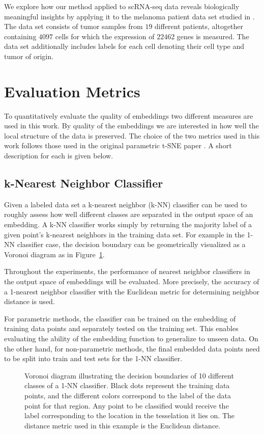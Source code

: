 We explore how our method applied to scRNA-seq data reveals biologically meaningful insights by applying it to the melanoma patient data set studied in \cite{tirosh}. The data set consists of tumor samples from $19$ different patients, altogether containing $4097$ cells for which the expression of $22462$ genes is measured. The data set additionally includes labels for each cell denoting their cell type and tumor of origin.

\section{Evaluation Metrics}

To quantitatively evaluate the quality of embeddings two different measures are used in this work. By quality of the embeddings we are interested in how well the local structure of the data is preserved. The choice of the two metrics used in this work follows those used in the original parametric t-SNE paper \cite{parametric_tsne}. A short description for each is given below.

\subsection{k-Nearest Neighbor Classifier}

Given a labeled data set a k-nearest neighbor (k-NN) classifier can be used to roughly assess how well different classes are separated in the output space of an embedding. A k-NN classifier works simply by returning the majority label of a given point's k-nearest neighbors in the training data set. For example in the 1-NN classifier case, the decision boundary can be geometrically visualized as a Voronoi diagram as in Figure~\ref{fig:voronoi}.

Throughout the experiments, the performance of nearest neighbor classifiers in the output space of embeddings will be evaluated. More precisely, the accuracy of a 1-nearest neighbor classifier with the Euclidean metric for determining neighbor distance is used.

For parametric methods, the classifier can be trained on the embedding of training data points and separately tested on the training set. This enables evaluating the ability of the embedding function to generalize to unseen data. On the other hand, for non-parametric methods, the final embedded data points need to be split into train and test sets for the 1-NN classifier.

\begin{figure}[!htb]
  \centering
  \resizebox{0.5\textwidth}{!}{\unskip}
  \caption{Voronoi diagram illustrating the decision boundaries of 10 different classes of a 1-NN classifier. Black dots represent the training data points, and the different colors correspond to the label of the data point for that region. Any point to be classified would receive the label corresponding to the location in the tesselation it lies on. The distance metric used in this example is the Euclidean distance.}
  \label{fig:voronoi}
\end{figure}

